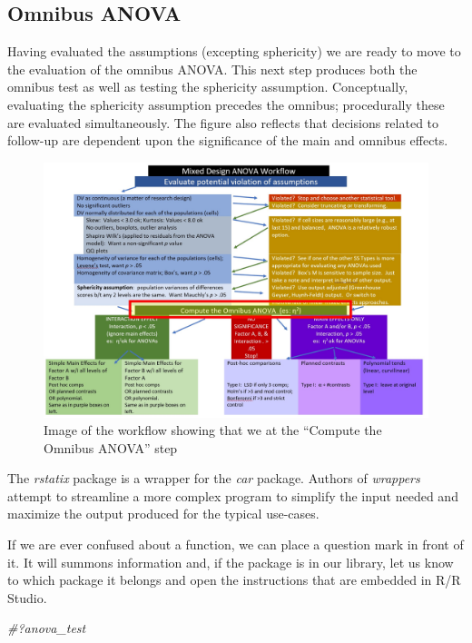 \documentclass[
  11pt,
]{book}
\newenvironment{Shaded}{\begin{snugshade}}{\end{snugshade}}
\newcommand{\CommentTok}[1]{\textcolor[rgb]{0.56,0.35,0.01}{\textit{#1}}}
\begin{document}
\hypertarget{omnibus-anova}{%
\subsection{Omnibus ANOVA}\label{omnibus-anova}}

Having evaluated the assumptions (excepting sphericity) we are ready to move to the evaluation of the omnibus ANOVA. This next step produces both the omnibus test as well as testing the sphericity assumption. Conceptually, evaluating the sphericity assumption precedes the omnibus; procedurally these are evaluated simultaneously. The figure also reflects that decisions related to follow-up are dependent upon the significance of the main and omnibus effects.

\begin{figure}
\centering
\includegraphics{images/mixed/mx_omnibus.jpg}
\caption{Image of the workflow showing that we at the ``Compute the Omnibus ANOVA'' step}
\end{figure}

The \emph{rstatix} package is a wrapper for the \emph{car} package. Authors of \emph{wrappers} attempt to streamline a more complex program to simplify the input needed and maximize the output produced for the typical use-cases.

If we are ever confused about a function, we can place a question mark in front of it. It will summons information and, if the package is in our library, let us know to which package it belongs and open the instructions that are embedded in R/R Studio.

\begin{Shaded}
\begin{Highlighting}[]
\CommentTok{\#?anova\_test}
\end{Highlighting}
\end{Shaded}
\end{document}
